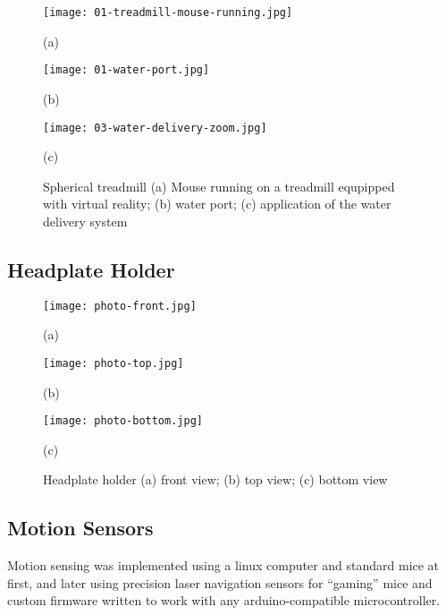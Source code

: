 \documentclass[../main.tex]{subfiles}
\begin{document}
\begin{figure}[htb]
	\begin{minipage}[t]{0.32\linewidth}\centering
		\texttt{[image: 01-treadmill-mouse-running.jpg]}
		\centerline{(a)}
	\end{minipage}
	\hfill
	\begin{minipage}[t]{0.15\linewidth}\centering
		\texttt{[image: 01-water-port.jpg]}
		\centerline{(b)}
	\end{minipage}
	\begin{minipage}[t]{0.45\linewidth}\centering
		\texttt{[image: 03-water-delivery-zoom.jpg]}
		\centerline{(c)}
	\end{minipage}
	\caption{
		Spherical treadmill (a) Mouse running on a treadmill equpipped with virtual reality;
		(b) water port; (c) application of the water delivery system }
	\label{fig:Spherical treadmill}
\end{figure}

\subsection{Headplate Holder}\label{sec:headplate-holder}

\begin{figure}[htb]
	\begin{minipage}[t]{0.32\linewidth}\centering \texttt{[image: photo-front.jpg]} \centerline{(a)}
	\end{minipage}
	\hfill
	\begin{minipage}[t]{0.32\linewidth}\centering \texttt{[image: photo-top.jpg]} \centerline{(b)}
	\end{minipage}
	\begin{minipage}[t]{0.32\linewidth}\centering \texttt{[image: photo-bottom.jpg]} \centerline{(c)}
	\end{minipage}
	\caption{Headplate holder (a) front view;
		(b) top view; (c) bottom view}
	\label{fig:Spherical treadmill}
\end{figure}

\subsection{Motion Sensors}\label{sec:motion-sensors}

Motion sensing was implemented using a linux computer and standard mice at first, and later using precision laser navigation sensors for ``gaming'' mice and custom firmware written to work with any arduino-compatible microcontroller.
\end{document}
